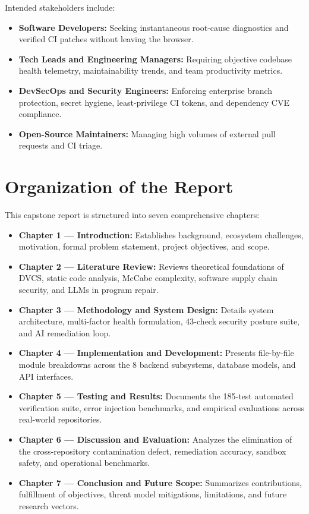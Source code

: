 \documentclass[12pt,a4paper,oneside]{report}
\begin{document}
Intended stakeholders include:
\begin{itemize}
    \item \textbf{Software Developers:} Seeking instantaneous root-cause diagnostics and verified CI patches without leaving the browser.
    \item \textbf{Tech Leads and Engineering Managers:} Requiring objective codebase health telemetry, maintainability trends, and team productivity metrics.
    \item \textbf{DevSecOps and Security Engineers:} Enforcing enterprise branch protection, secret hygiene, least-privilege CI tokens, and dependency CVE compliance.
    \item \textbf{Open-Source Maintainers:} Managing high volumes of external pull requests and CI triage.
\end{itemize}

\section{Organization of the Report}
\label{sec:organization}

This capstone report is structured into seven comprehensive chapters:
\begin{itemize}
    \item \textbf{Chapter 1 --- Introduction:} Establishes background, ecosystem challenges, motivation, formal problem statement, project objectives, and scope.
    \item \textbf{Chapter 2 --- Literature Review:} Reviews theoretical foundations of DVCS, static code analysis, McCabe complexity, software supply chain security, and LLMs in program repair.
    \item \textbf{Chapter 3 --- Methodology and System Design:} Details system architecture, multi-factor health formulation, 43-check security posture suite, and AI remediation loop.
    \item \textbf{Chapter 4 --- Implementation and Development:} Presents file-by-file module breakdowns across the 8 backend subsystems, database models, and API interfaces.
    \item \textbf{Chapter 5 --- Testing and Results:} Documents the 185-test automated verification suite, error injection benchmarks, and empirical evaluations across real-world repositories.
    \item \textbf{Chapter 6 --- Discussion and Evaluation:} Analyzes the elimination of the cross-repository contamination defect, remediation accuracy, sandbox safety, and operational benchmarks.
    \item \textbf{Chapter 7 --- Conclusion and Future Scope:} Summarizes contributions, fulfillment of objectives, threat model mitigations, limitations, and future research vectors.
\end{itemize}
\end{document}
